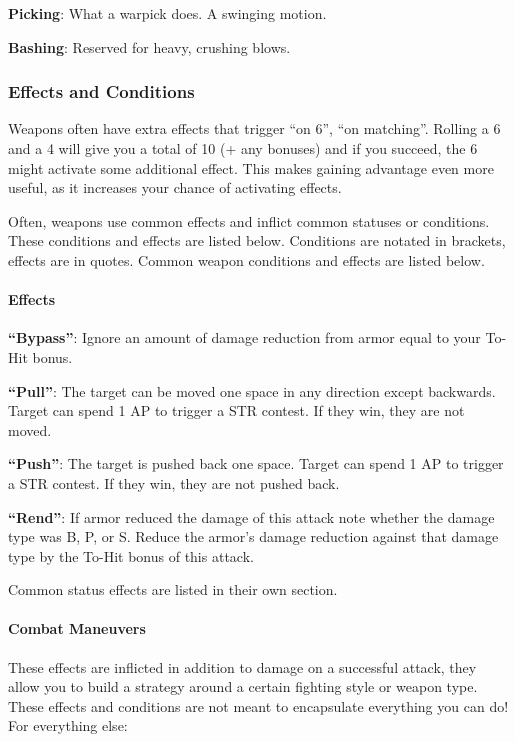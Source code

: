 \documentclass[
  letterpaper,
  DIV=11,
  numbers=noendperiod]{scrartcl}
\let\oldparagraph\paragraph
\renewcommand{\paragraph}[1]{\oldparagraph{#1}\mbox{}}
\begin{document}
\textbf{Picking}: What a warpick does. A swinging motion.

\textbf{Bashing}: Reserved for heavy, crushing blows.

\subsubsection{Effects and Conditions}\label{effects-and-conditions}

Weapons often have extra effects that trigger ``on 6'', ``on matching''.
Rolling a 6 and a 4 will give you a total of 10 (+ any bonuses) and if
you succeed, the 6 might activate some additional effect. This makes
gaining advantage even more useful, as it increases your chance of
activating effects.

Often, weapons use common effects and inflict common statuses or
conditions. These conditions and effects are listed below. Conditions
are notated in brackets, effects are in quotes. Common weapon conditions
and effects are listed below.

\paragraph{Effects}\label{effects}

\textbf{``Bypass''}: Ignore an amount of damage reduction from armor
equal to your To-Hit bonus.

\textbf{``Pull''}: The target can be moved one space in any direction
except backwards. Target can spend 1 AP to trigger a STR contest. If
they win, they are not moved.

\textbf{``Push''}: The target is pushed back one space. Target can spend
1 AP to trigger a STR contest. If they win, they are not pushed back.

\textbf{``Rend''}: If armor reduced the damage of this attack note
whether the damage type was B, P, or S. Reduce the armor's damage
reduction against that damage type by the To-Hit bonus of this attack.

Common status effects are listed in their own section.

\paragraph{Combat Maneuvers}\label{combat-maneuvers}

These effects are inflicted in addition to damage on a successful
attack, they allow you to build a strategy around a certain fighting
style or weapon type. These effects and conditions are not meant to
encapsulate everything you can do! For everything else:
\end{document}
